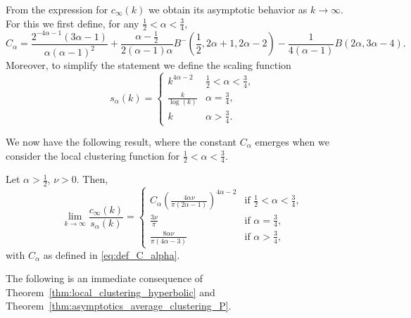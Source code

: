 From the expression for $c_\infty(k)$ we obtain its asymptotic behavior as $k \to \infty$. For this we first define, for any $\frac{1}{2} < \alpha < \frac{3}{4}$,
\begin{equation}\label{eq:def_C_alpha}
	C_\alpha = \frac{2^{-4\alpha - 1}(3\alpha - 1)}{\alpha(\alpha-1)^2} 
	+ \frac{\alpha - \frac{1}{2}}{2(\alpha - 1)\alpha} B^-(\frac{1}{2},2\alpha + 1, 2\alpha - 2)
	- \frac{1}{4(\alpha - 1)}B(2\alpha, 3\alpha - 4).
\end{equation}
Moreover, to simplify the statement we define the scaling function 
\begin{equation}\label{eq:def_scaling_function}
s_\alpha(k) = \begin{cases} 
		k^{4\alpha-2} &\frac{1}{2}<\alpha<\frac{3}{4}, \\
		\frac{k}{\log(k)} & \alpha = \frac{3}{4}, \\
		k &\alpha > \frac{3}{4}.
\end{cases}
\end{equation}

We now have the following result, where the constant $C_\alpha$ emerges when we consider the local clustering function for $\frac{1}{2} < \alpha < \frac{3}{4}$.

\begin{theorem}\label{thm:asymptotics_average_clustering_P}
Let $\alpha > \frac{1}{2}$, $\nu > 0$. Then,
\[
	\lim_{k \to \infty} \frac{c_\infty(k)}{s_\alpha(k)} 
	= \begin{cases}
			C_\alpha \left(\frac{4\alpha \nu}{\pi\left(2\alpha - 1\right)}\right)^{4\alpha - 2}
			&\mbox{if } \frac{1}{2} < \alpha < \frac{3}{4},\\
			\frac{3 \nu}{\pi} &\mbox{if } \alpha = \frac{3}{4},\\
			\frac{8\alpha \nu}{\pi\left(4\alpha - 3\right)} &\mbox{if } \alpha > \frac{3}{4},
	\end{cases}
\]
with $C_\alpha$ as defined in \eqref{eq:def_C_alpha}.
\end{theorem}
The following is an immediate consequence of Theorem~\ref{thm:local_clustering_hyperbolic} and Theorem~\ref{thm:asymptotics_average_clustering_P}.

